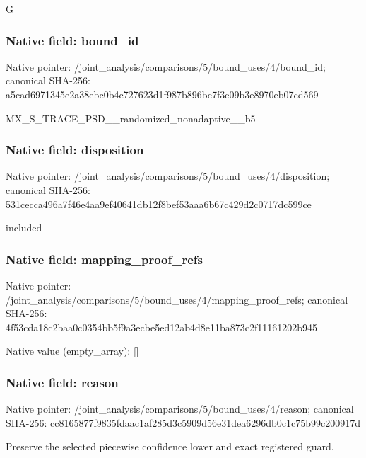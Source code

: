 \documentclass[10pt,a4paper]{article}
\begin{document}
\begingroup\raggedright\sloppy G\par\endgroup

\subsubsection{Native field: bound\_\allowbreak{}id}
Native pointer: /joint\_\allowbreak{}analysis/comparisons/5/bound\_\allowbreak{}uses/4/bound\_\allowbreak{}id; canonical SHA-256: a5cad6971345e2a38ebc0b4c727623d1f987b896bc7f3e09b3e8970eb07cd569

\begingroup\raggedright\sloppy MX\_\allowbreak{}S\_\allowbreak{}TRACE\_\allowbreak{}PSD\_\allowbreak{}\_\allowbreak{}randomized\_\allowbreak{}nonadaptive\_\allowbreak{}\_\allowbreak{}b5\par\endgroup

\subsubsection{Native field: disposition}
Native pointer: /joint\_\allowbreak{}analysis/comparisons/5/bound\_\allowbreak{}uses/4/disposition; canonical SHA-256: 531cecca496a7f46e4aa9ef40641db12f8bef53aaa6b67c429d2c0717dc599ce

\begingroup\raggedright\sloppy included\par\endgroup

\subsubsection{Native field: mapping\_\allowbreak{}proof\_\allowbreak{}refs}
Native pointer: /joint\_\allowbreak{}analysis/comparisons/5/bound\_\allowbreak{}uses/4/mapping\_\allowbreak{}proof\_\allowbreak{}refs; canonical SHA-256: 4f53cda18c2baa0c0354bb5f9a3ecbe5ed12ab4d8e11ba873c2f11161202b945

Native value (empty\_\allowbreak{}array): []

\subsubsection{Native field: reason}
Native pointer: /joint\_\allowbreak{}analysis/comparisons/5/bound\_\allowbreak{}uses/4/reason; canonical SHA-256: cc8165877f9835fdaac1af285d3c5909d56e31dea6296db0c1c75b99c200917d

\begingroup\raggedright\sloppy Preserve the selected piecewise confidence lower and exact registered guard.\par\endgroup
\end{document}
